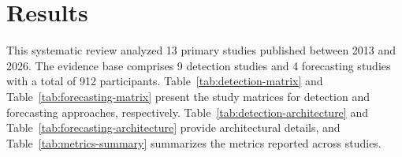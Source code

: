 
\section{Results}
\label{sec:results}

This systematic review analyzed 13 primary studies published between 2013 and 2026. The evidence base comprises 9 detection studies and 4 forecasting studies with a total of 912 participants. Table~\ref{tab:detection-matrix} and Table~\ref{tab:forecasting-matrix} present the study matrices for detection and forecasting approaches, respectively. Table~\ref{tab:detection-architecture} and Table~\ref{tab:forecasting-architecture} provide architectural details, and Table~\ref{tab:metrics-summary} summarizes the metrics reported across studies.





%



%
%
%
